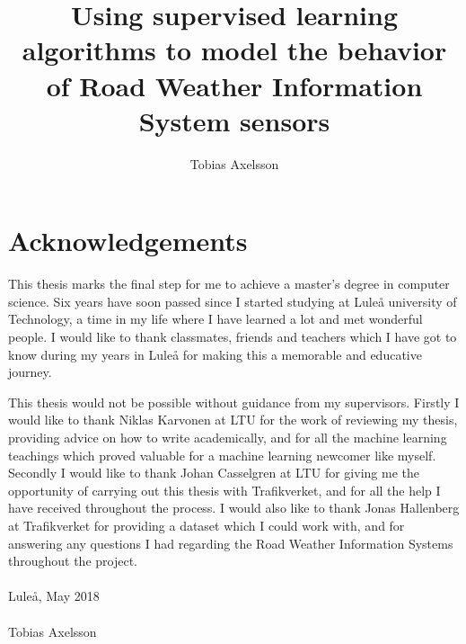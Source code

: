 \documentclass[oneside, 11pt]{report} %
\title{Using supervised learning algorithms to model the behavior of Road Weather Information System sensors}
\author{Tobias Axelsson}
\begin{document}
\maketitle

\chapter*{Acknowledgements}
	This thesis marks the final step for me to achieve a master's degree in computer science. Six years have soon passed since I started studying at Luleå university of Technology, a time in my life where I have learned a lot and met wonderful people. I would like to thank classmates, friends and teachers which I have got to know during my years in Luleå for making this a memorable and educative journey. 

	This thesis would not be possible without guidance from my supervisors. Firstly I would like to thank Niklas Karvonen at LTU for the work of reviewing my thesis, providing advice on how to write academically, and for all the machine learning teachings which proved valuable for a machine learning newcomer like myself. Secondly I would like to thank Johan Casselgren at LTU for giving me the opportunity of carrying out this thesis with Trafikverket, and for all the help I have received throughout the process. I would also like to thank Jonas Hallenberg at Trafikverket for providing a dataset which I could work with, and for answering any questions I had regarding the Road Weather Information Systems throughout the project.\\\\
	Luleå, May 2018\\\\
	Tobias Axelsson
\end{document}
